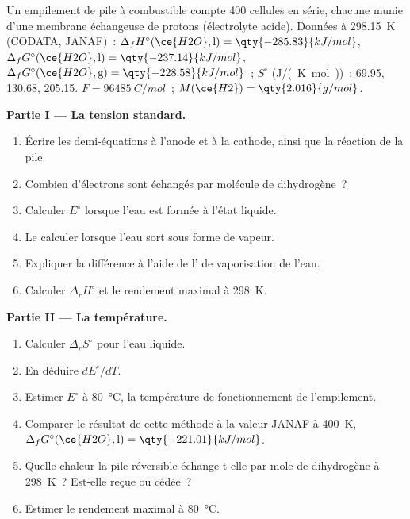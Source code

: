 \begin{problem}
\label{pb:b2:cell-thermodynamics:1}
Un empilement de pile à combustible compte 400 cellules en série, chacune munie d'une membrane
échangeuse de protons (électrolyte acide). Données à \qty{298.15}{K} (CODATA, JANAF)~:
$\Delta_f H^\circ(\ce{H2O}, \text{l}) = \qty{-285.83}{kJ/mol}$, $\Delta_f
G^\circ(\ce{H2O}, \text{l}) = \qty{-237.14}{kJ/mol}$, $\Delta_f G^\circ(\ce{H2O},
\text{g}) = \qty{-228.58}{kJ/mol}$~; $S^\circ$ (\unit{J/(K.mol)})~:  69.95,
 130.68,  205.15. $F = \qty{96485}{C/mol}$~; $M(\ce{H2}) =
\qty{2.016}{g/mol}$.

\medskip
\noindent\textbf{Partie I --- La tension standard.}
\begin{enumerate}
  \item Écrire les demi-équations à l'anode et à la cathode, ainsi que la réaction
        de la pile.
  \item Combien d'électrons sont échangés par molécule de dihydrogène~?
  \item Calculer $E^\circ$ lorsque l'eau est formée à l'état liquide.
  \item Le calculer lorsque l'eau sort sous forme de vapeur.
  \item Expliquer la différence à l'aide de l' de vaporisation de l'eau.
  \item Calculer $\Delta_r H^\circ$ et le rendement maximal à \qty{298}{K}.
\end{enumerate}

\medskip
\noindent\textbf{Partie II --- La température.}
\begin{enumerate}[resume]
  \item Calculer $\Delta_r S^\circ$ pour l'eau liquide.
  \item En déduire $dE^\circ/dT$.
  \item Estimer $E^\circ$ à \qty{80}{\degreeCelsius}, la température de fonctionnement de
        l'empilement.
  \item Comparer le résultat de cette méthode à la valeur JANAF à \qty{400}{K}, $\Delta_f
        G^\circ(\ce{H2O}, \text{l}) = \qty{-221.01}{kJ/mol}$.
  \item Quelle chaleur la pile réversible échange-t-elle par mole de dihydrogène à
        \qty{298}{K}~? Est-elle reçue ou cédée~?
  \item Estimer le rendement maximal à \qty{80}{\degreeCelsius}.
\end{enumerate}


\end{problem}
